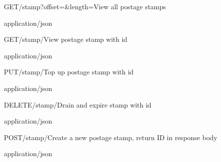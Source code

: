 
\begin{apiRoute}{GET}{/stamp?offset=\&length=}{View all postage stamps}
{
}
{ }
\begin{queryParameter} 
\end{queryParameter}

\begin{routeResponse}{application/json}
\end{routeResponse}
\end{apiRoute}



\begin{apiRoute}{GET}{/stamp/}{View postage stamp with id}
{
}
{ }

\begin{routeParameter} 
\end{routeParameter}
\begin{routeResponse}{application/json}
\end{routeResponse}
\end{apiRoute}




\begin{apiRoute}{PUT}{/stamp/}{Top up postage stamp with id}
{
}
{ }

\begin{routeParameter} 
\end{routeParameter}
\begin{queryParameter} 
\end{queryParameter}

\begin{routeResponse}{application/json}
\end{routeResponse}
\end{apiRoute}




\begin{apiRoute}{DELETE}{/stamp/}{Drain and expire stamp with id}
{
}
{ }

\begin{routeParameter} 
\end{routeParameter}
\begin{routeResponse}{application/json}
\end{routeResponse}
\end{apiRoute}


\begin{apiRoute}{POST}{/stamp/}{Create a new postage stamp, return ID in response body}
{
}
{ }

\begin{routeParameter} 
\end{routeParameter}
\begin{routeResponse}{application/json}
\end{routeResponse}
\end{apiRoute}
